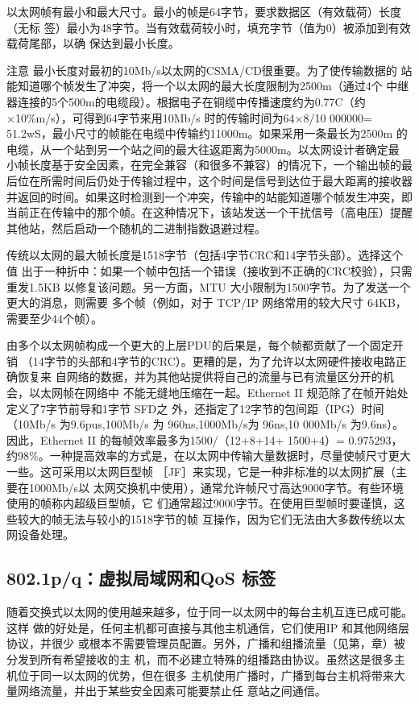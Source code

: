 以太网帧有最小和最大尺寸。最小的帧是64字节，要求数据区（有效载荷）长度（无标
签）最小为48字节。当有效载荷较小时，填充字节（值为0）被添加到有效载荷尾部，以确
保达到最小长度。

注意 最小长度对最初的10Mb/s以太网的CSMA/CD很重要。为了使传输数据的
站能知道哪个帧发生了冲突，将一个以太网的最大长度限制为2500m（通过4个
中继器连接的5个500m的电缆段）。根据电子在铜缆中传播速度约为0.77C（约
×10\%m/s），可得到64字节来用10Mb/s 时的传输时间为64×8/10 000000=
51.2wS，最小尺寸的帧能在电缆中传输约11000m。如果采用一条最长为2500m
的电缆，从一个站到另一个站之间的最大往返距离为5000m。以太网设计者确定最
小帧长度基于安全因素，在完全兼容（和很多不兼容）的情况下，一个输出帧的最
后位在所需时间后仍处于传输过程中，这个时间是信号到达位于最大距离的接收器
并返回的时间。如果这时检测到一个冲突，传输中的站能知道哪个帧发生冲突，即
当前正在传输中的那个帧。在这种情况下，该站发送一个干扰信号（高电压）提醒
其他站，然后启动一个随机的二进制指数退避过程。

传统以太网的最大帧长度是1518字节（包括4字节CRC和14字节头部）。选择这个值
出于一种折中：如果一个帧中包括一个错误（接收到不正确的CRC校验），只需重发1.5KB
以修复该问题。另一方面，MTU 大小限制为1500字节。为了发送一个更大的消息，则需要
多个帧（例如，对于 TCP/IP 网络常用的较大尺寸 64KB，需要至少44个帧）。

由多个以太网帧构成一个更大的上层PDU的后果是，每个帧都贡献了一个固定开销
（14字节的头部和4字节的CRC）。更糟的是，为了允许以太网硬件接收电路正确恢复来
自网络的数据，并为其他站提供将自己的流量与已有流量区分开的机会，以太网帧在网络中
不能无缝地压缩在一起。Ethernet II 规范除了在帧开始处定义了7字节前导和1字节 SFD之
外，还指定了12字节的包间距（IPG）时间（10Mb/s 为9.6pus,100Mb/s 为 960ns,1000Mb/s为
96ns,10 000Mb/s 为9.6ns）。因此，Ethernet II 的每帧效率最多为1500/（12+8+14+ 1500+4）=
0.975293，约98\%。一种提高效率的方式是，在以太网中传输大量数据时，尽量使帧尺寸更大
一些。这可采用以太网巨型帧 ［JF］来实现，它是一种非标准的以太网扩展（主要在1000Mb/s以
太网交换机中使用），通常允许帧尺寸高达9000字节。有些环境使用的帧称内超级巨型帧，它
们通常超过9000字节。在使用巨型帧时要谨慎，这些较大的帧无法与较小的1518字节的帧
互操作，因为它们无法由大多数传统以太网设备处理。

\subsection{802.1p/q：虚拟局域网和QoS 标签}

随着交换式以太网的使用越来越多，位于同一以太网中的每台主机互连已成可能。这样
做的好处是，任何主机都可直接与其他主机通信，它们使用IP 和其他网络层协议，并很少
或根本不需要管理员配置。另外，广播和组播流量（见第，章）被分发到所有希望接收的主
机，而不必建立特殊的组播路由协议。虽然这是很多主机位于同一以太网的优势，但在很多
主机使用广播时，广播到每台主机将带来大量网络流量，并出于某些安全因素可能要禁止任
意站之间通信。

